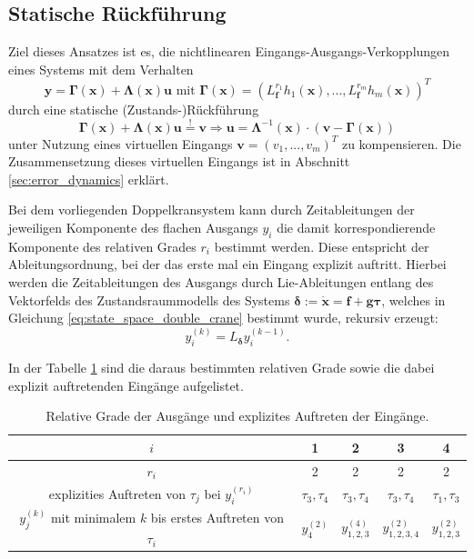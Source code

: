 \subsection{Statische Rückführung}
\label{sec:static_state_feedback}
Ziel dieses Ansatzes ist es, die nichtlinearen Eingangs-Ausgangs-Verkopplungen eines Systems mit dem Verhalten
\begin{equation}
	\mathbf{y} = \boldsymbol{\Gamma}(\mathbf{x}) + \boldsymbol{\Lambda}(\mathbf{x}) \boldsymbol{u} \text{ mit } \boldsymbol{\Gamma}(\mathbf{x}) = (L_{\mathbf{f}}^{r_1} h_1(\mathbf{x}), ..., L_{\mathbf{f}}^{r_m} h_m(\mathbf{x}))^T
\end{equation}
durch eine statische (Zustands-)Rückführung
\begin{equation}
	\label{eq:static_state_feedback}
	\boldsymbol{\Gamma}(\mathbf{x}) + \boldsymbol{\Lambda}(\mathbf{x}) \mathbf{u} \stackrel{!}{=} \mathbf{v} \Rightarrow \mathbf{u} = \boldsymbol{\Lambda}^{-1}(\mathbf{x}) \cdot (\mathbf{v} - \boldsymbol{\Gamma}(\mathbf{x}))
\end{equation}
unter Nutzung eines virtuellen Eingangs $\mathbf{v} = (v_1, ..., v_m)^T$ zu kompensieren. Die Zusammensetzung dieses virtuellen Eingangs ist in Abschnitt \ref{sec:error_dynamics} erklärt. \cite[S. 195]{NLRT_Roebenack}

Bei dem vorliegenden Doppelkransystem kann durch Zeitableitungen der jeweiligen Komponente des flachen Ausgangs $y_i$ die damit korrespondierende Komponente des relativen Grades $r_i$ bestimmt werden. Diese entspricht der Ableitungsordnung, bei der das erste mal ein Eingang explizit auftritt. Hierbei werden die Zeitableitungen des Ausgangs durch Lie-Ableitungen entlang des Vektorfelds des Zustandsraummodells des Systems $\boldsymbol{\delta} := \dot{\mathbf{x}} = \mathbf{f} + \mathbf{g} \boldsymbol{\tau}$, welches in Gleichung \eqref{eq:state_space_double_crane} bestimmt wurde, rekursiv erzeugt: 
\begin{equation}
	\label{eq:Lie_time_deriv}
	y_i^{(k)} = L_{\boldsymbol{\delta}} y_i^{(k-1)} .
\end{equation}

In der Tabelle \ref{tab:relative_degrees} sind die daraus bestimmten relativen Grade sowie die dabei explizit auftretenden Eingänge aufgelistet.
\begin{table}[htbp]%
	\centering
	\caption{Relative Grade der Ausgänge und explizites Auftreten der Eingänge.}
	\label{tab:relative_degrees}
	\begin{tabular}{c| c c c c} 
		$i$ & 1 & 2 & 3 & 4 \\ 
		\hline
		$r_i$ & 2 & 2 & 2 & 2\\ 
		\hline
		explizities Auftreten von $\tau_j$ bei $y_i^{(r_i)}$ & $\tau_3, \tau_4$ & $\tau_3, \tau_4$ & $\tau_3, \tau_4$ & $\tau_1, \tau_3$ \\
		\hline
		$y_j^{(k)}$ mit minimalem $k$ bis erstes Auftreten von $\tau_i$ & $y_4^{(2)}$ & $y_{1,2,3}^{(4)}$ & $y_{1,2,3,4}^{(2)}$ & $y_{1,2,3}^{(2)}$\\
		\bottomrule
	\end{tabular}
\end{table}

